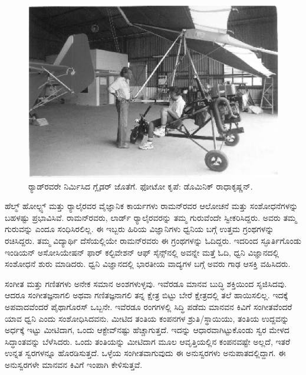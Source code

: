 \begin{figure}[!htpb]
\centering
\includegraphics[scale=0.215]{"images/21.jpg"}
\caption{ರ‍್ಯಾಡ್‍ರವರೇ ನಿರ್ಮಿಸಿದ ಗ್ಲೈಡರ್ ಜೊತೆಗೆ. ಫೋಟೋ ಕೃಪೆ: ಡೊಮಿನಿಕ್ ರಾಧಾಕೃಷ್ಣನ್.}\label{chap5-fig06}
\end{figure}



ಹೆಲ್ಮ್ ‍ಹೋಲ್ಟ್ಸ್ ಮತ್ತು ರ‍್ಯಾಲೈರವರ ವೈಜ್ಞಾನಿಕ ಕಾರ್ಯಗಳು ರಾಮನ್‍ರವರ ಆಲೋಚನೆ ಮತ್ತು ಸಂಶೋಧನೆಗಳನ್ನು ಬಹಳಷ್ಟು ಪ್ರಭಾವಿಸಿವೆ. ರಾಮನ್‍ರವರು, ಲಾರ್ಡ್ ರ‍್ಯಾಲೈರವರನ್ನು ತಮ್ಮ ಗುರುವೆಂದೇ ಸ್ವೀಕರಿಸಿದ್ದರು. ಅವರು ತಮ್ಮ ಗುರುವನ್ನು ಎಂದೂ ಸಂಧಿಸಿರಲಿಲ್ಲ. ಈ ಇಬ್ಬರು ಹಿರಿಯ ವಿಜ್ಞಾನಿಗಳು ಧ್ವನಿಯ ಬಗ್ಗೆ ಉತ್ತಮ ಗ್ರಂಥಗಳನ್ನು ರಚಿಸಿದ್ದರು. ತಮ್ಮ ವಿದ್ಯಾರ್ಥಿ ದೆಸೆಯಲ್ಲಿಯೇ ರಾಮನ್‍ರವರು ಈ ಗ್ರಂಥಗಳನ್ನು ಓದಿದ್ದರು. ಇದರಿಂದ ಸ್ಫೂರ್ತಿಗೊಂಡು ಇಂಡಿಯನ್ ಅಸೋಸಿಯೇಷನ್ ಫಾರ್ ಕಲ್ಟಿವೇಶನ್ ಆಫ್ ಸೈನ್ಸ್‌ನಲ್ಲಿ ಅವನ್ನೇ ಮತ್ತೆ ಓದಿ, ಧ್ವನಿ ವಿಜ್ಞಾನದಲ್ಲಿ ಸಂಶೋಧನೆ ಶುರು ಮಾಡಿದರು. ಧ್ವನಿ ವಿಜ್ಞಾನದಲ್ಲಿ ಭಾರತೀಯ ವಾದ್ಯಗಳ ಬಗ್ಗೆ ಅವರು ಗಾಢ ಆಸಕ್ತಿ ವಹಿಸಿದರು.

ಸಂಗೀತ ಮತ್ತು ಗಣಿತಗಳು ಅನೇಕ ಸಮಾನ ಅಂಶಗಳುಳ್ಳವು. ಇವೆರಡೂ ಮಾನವ ಬುದ್ಧಿ ಶಕ್ತಿಯಿಂದ ಸೃಜಿಸಿದವು. ಆದರೂ ಸಂಗೀತಜ್ಞನಾಗಲಿ ಅಥವಾ ಗಣಿತಜ್ಞನಾಗಲಿ ತನ್ನ ಕ್ಷೇತ್ರ ಬಿಟ್ಟು ಬೇರೆ ಕ್ಷೇತ್ರದಲ್ಲಿ ತಲೆ ಹಾಯಿಸಲಿಲ್ಲ. ಇದಕ್ಕೆ ಅಪವಾದವೆಂದರೆ ಪೈಥಾಗೊರಸ್ ಒಬ್ಬನೇ. ಇವೆರಡೂ ರಂಗಗಳಲ್ಲಿ ಸಿದ್ಧಿ ಪಡೆದು ಮಾನವನ ಕಿವಿಗೆ ಸಂಗೀತವೆಂದರೆ ಯಾವ ಧ್ವನಿ ಎಂದು ಸಂಶೋಧಿಸಿದವನು. ಮೀಟಿದ ತಂತಿಯ ಕಂಪನಗಳ ಶ್ರುತಿ/ಸ್ಥಾಯಿಯು, ತಂತಿಯ ಉದ್ದವನ್ನು ಅರ್ಧಕ್ಕೆ ಇಟ್ಟು ಮೀಟಿದಾಗ, ಒಂದು ಆಕ್ಟೇವ್‍ನಷ್ಟು ಹೆಚ್ಚಾಗುತ್ತದೆ. ಇದನ್ನು ಆಧಾರವಾಗಿಟ್ಟುಕೊಂಡು ಸ್ವರ ಮೇಳದ ಸಿದ್ಧಾಂತವನ್ನು ಬೆಳೆಸಿದರು. ಒಂದು ತಂತಿಯನ್ನು ಮೀಟಿದಾಗ ಮೂಲ ಆವೃತ್ತಿಯಲ್ಲಿನ ಕಂಪನವಷ್ಟೇ ಅಲ್ಲದೆ, ಇತರೆ ಉನ್ನತ ಸ್ವರಗಳನ್ನೂ ಹೊರಡಿಸುತ್ತದೆ. ಒಳ್ಳೆಯ ಸಂಗೀತವಾಗುವುದು ಈ ಅನುಸ್ವರಗಳು  ಅನುಪಾತದಲ್ಲಿದ್ದಾಗ. ಈ ಅನುಸ್ವರಗಳೇ ಮಾನವನ ಕಿವಿಗೆ ಇಂಪಾಗಿ ಕೇಳಿಸುತ್ತವೆ.

